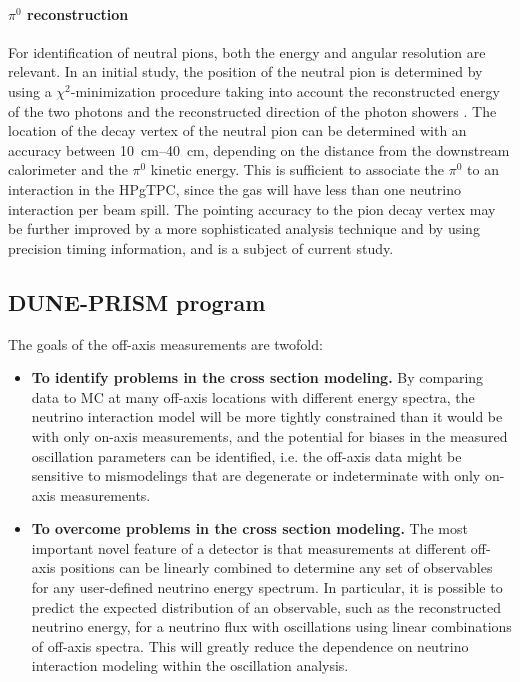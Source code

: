 \paragraph{$\pi^0$ reconstruction} For identification of neutral pions, both the energy and angular resolution are relevant. In an initial study, the position of the neutral pion is determined by using a $\chi^2$-minimization procedure taking into account the reconstructed energy of the two photons and the reconstructed direction of the photon showers \cite{Emberger:2018pgr}. The location of the decay vertex of the neutral pion can be determined with an accuracy between \SIrange{10}{40}{\cm}, depending on the distance from the downstream calorimeter and the $\pi^0$ kinetic energy. This is sufficient to associate the $\pi^0$ to an interaction in the HPgTPC, since the gas will have less than one neutrino interaction per beam spill.
The pointing accuracy to the pion decay vertex may be further improved by a more sophisticated analysis technique and by using precision timing information, and is a subject of current study.





\subsection{DUNE-PRISM program}
\label{sec:exsum-nd-DP}



The goals of the off-axis measurements are twofold:
\begin{itemize}
\item {\bf To identify problems in the cross section modeling.} By comparing   data to MC at many off-axis locations with different energy spectra, the neutrino interaction model will be more tightly constrained than it would be with only on-axis measurements, and the potential for biases in the measured oscillation parameters can be identified, i.e. the off-axis data might be sensitive to mismodelings that are degenerate or indeterminate with only on-axis measurements.
\item {\bf To overcome problems in the cross section modeling.} The most important novel feature of a  detector is that measurements at different off-axis positions can be linearly combined to determine any set of observables for any user-defined neutrino energy spectrum. In particular, it is possible to predict the expected distribution of an observable, such as the reconstructed neutrino energy, for a neutrino flux with oscillations  using linear combinations of   off-axis spectra.  This will greatly reduce the dependence on neutrino interaction modeling within the oscillation analysis.
\end{itemize}

